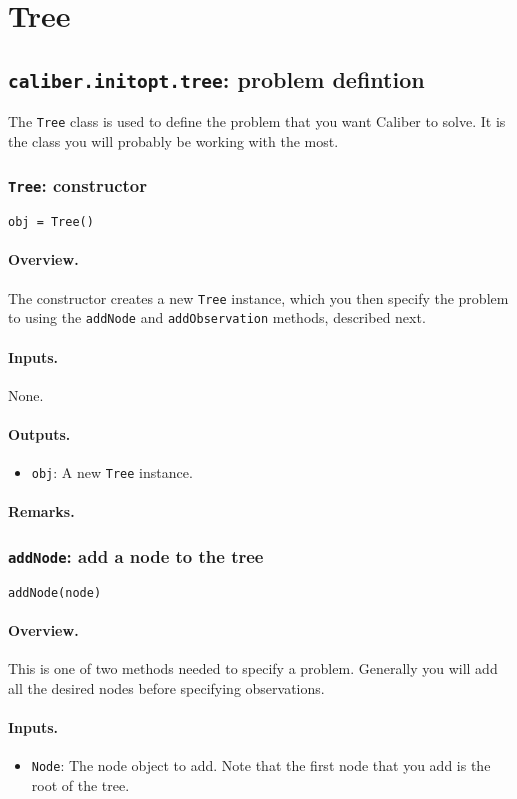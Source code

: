 \section{Tree}

\subsection{\texttt{caliber.initopt.tree}: problem defintion}
The \texttt{Tree} class is used to define the problem that you want Caliber to solve.
It is the class you will probably be working with the most.
\subsubsection{\texttt{Tree}: constructor}
\texttt{obj = Tree()}
\paragraph{Overview.}
The constructor creates a new \texttt{Tree} instance, which you then specify the problem to
using the \texttt{addNode} and \texttt{addObservation} methods, described next.
\paragraph{Inputs.}
None.
\paragraph{Outputs.}
\begin{itemize}
	\item \texttt{obj}: A new \texttt{Tree} instance.
\end{itemize}
\paragraph{Remarks.}

\subsubsection{\texttt{addNode}: add a node to the tree}
\texttt{addNode(node)}
\paragraph{Overview.}
This is one of two methods needed to specify a problem.
Generally you will add all the desired nodes before specifying observations.
\paragraph{Inputs.}
\begin{itemize}
	\item \texttt{Node}: The node object to add. Note that the first node that you add
		is the root of the tree.
\end{itemize}
